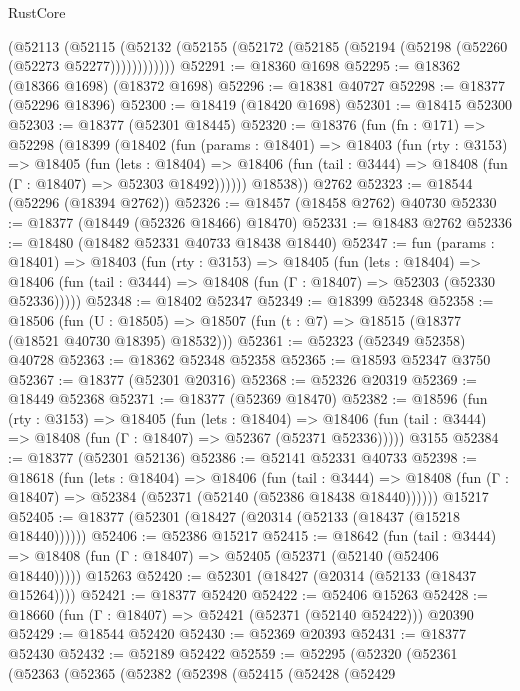 \begin{lexlean}{RustCore}
\begin{coremodule}
        (@52113
          (@52115 (@52132 (@52155 (@52172 (@52185 (@52194 (@52198 (@52260 (@52273 @52277))))))))))))
@52291 := @18360 @1698
@52295 := @18362 (@18366 @1698) (@18372 @1698)
@52296 := @18381 @40727
@52298 := @18377 (@52296 @18396)
@52300 := @18419 (@18420 @1698)
@52301 := @18415 @52300
@52303 := @18377 (@52301 @18445)
@52320 := @18376
    (fun (fn : @171) =>
    @52298
      (@18399
        (@18402
          (fun (params : @18401) =>
          @18403
            (fun (rty : @3153) =>
            @18405
              (fun (lets : @18404) =>
              @18406 (fun (tail : @3444) => @18408 (fun (Γ : @18407) => @52303 @18492))))))
        @18538))
    @2762
@52323 := @18544 (@52296 (@18394 @2762))
@52326 := @18457 (@18458 @2762) @40730
@52330 := @18377 (@18449 (@52326 @18466) @18470)
@52331 := @18483 @2762
@52336 := @18480 (@18482 @52331 @40733 @18438 @18440)
@52347 := fun (params : @18401) =>
  @18403
    (fun (rty : @3153) =>
    @18405
      (fun (lets : @18404) =>
      @18406 (fun (tail : @3444) => @18408 (fun (Γ : @18407) => @52303 (@52330 @52336)))))
@52348 := @18402 @52347
@52349 := @18399 @52348
@52358 := @18506
    (fun (U : @18505) => @18507 (fun (t : @7) => @18515 (@18377 (@18521 @40730 @18395) @18532)))
@52361 := @52323 (@52349 @52358) @40728
@52363 := @18362 @52348 @52358
@52365 := @18593 @52347 @3750
@52367 := @18377 (@52301 @20316)
@52368 := @52326 @20319
@52369 := @18449 @52368
@52371 := @18377 (@52369 @18470)
@52382 := @18596
    (fun (rty : @3153) =>
    @18405
      (fun (lets : @18404) =>
      @18406 (fun (tail : @3444) => @18408 (fun (Γ : @18407) => @52367 (@52371 @52336)))))
    @3155
@52384 := @18377 (@52301 @52136)
@52386 := @52141 @52331 @40733
@52398 := @18618
    (fun (lets : @18404) =>
    @18406
      (fun (tail : @3444) =>
      @18408 (fun (Γ : @18407) => @52384 (@52371 (@52140 (@52386 @18438 @18440))))))
    @15217
@52405 := @18377 (@52301 (@18427 (@20314 (@52133 (@18437 (@15218 @18440))))))
@52406 := @52386 @15217
@52415 := @18642
    (fun (tail : @3444) => @18408 (fun (Γ : @18407) => @52405 (@52371 (@52140 (@52406 @18440)))))
    @15263
@52420 := @52301 (@18427 (@20314 (@52133 (@18437 @15264))))
@52421 := @18377 @52420
@52422 := @52406 @15263
@52428 := @18660 (fun (Γ : @18407) => @52421 (@52371 (@52140 @52422))) @20390
@52429 := @18544 @52420
@52430 := @52369 @20393
@52431 := @18377 @52430
@52432 := @52189 @52422
@52559 := @52295
    (@52320
      (@52361
        (@52363
          (@52365
            (@52382
              (@52398
                (@52415
                  (@52428
                    (@52429

\end{coremodule}
\end{lexlean}
